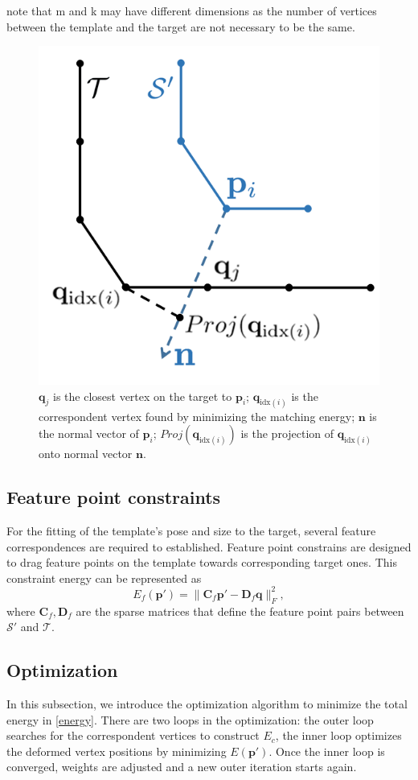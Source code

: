 note that m and k may have different dimensions as the number of vertices between the template and the target are not necessary to be the same.
\begin{figure}[th]
	\begin{center}
			\includegraphics[width=0.6\columnwidth]{./figure/correspondence.png}
	\end{center}
	\caption{$\mathbf q_j$ is the closest vertex on the target to $\mathbf p_i$; $\mathbf q_{\text{idx}(i)}$ is the correspondent vertex found by minimizing the matching energy; $\mathbf{n}$ is the normal vector of $\mathbf p_i$; $Proj(\mathbf q_{\text{idx}(i)})$ is the projection of $\mathbf q_{\text{idx}(i)}$ onto normal vector $\mathbf n$. }
	\label{fig:4}
\end{figure}

\subsection{Feature point constraints}
For the fitting of the template's pose and size to the target, several feature correspondences are required to established. Feature point constrains are designed to drag feature points on the template towards corresponding target ones. This constraint energy can be represented as
\begin{equation}
E_f(\mathbf p') = \|\mathbf C_f \mathbf p' - \mathbf D_f \mathbf q\|_F^2,
\end{equation}
where $\mathbf C_f, \mathbf D_f$ are the sparse matrices that define the feature point pairs between $\mathcal S'$ and $\mathcal T$.


\subsection{Optimization}
In this subsection, we introduce the optimization algorithm to minimize the total energy in \eqref{energy}. There are two loops in the optimization: the outer loop searches for the correspondent vertices to construct $E_c$, the inner loop optimizes the deformed vertex positions by minimizing $E(\mathbf p')$. Once the inner loop is converged, weights are adjusted and a new outer iteration starts again.

